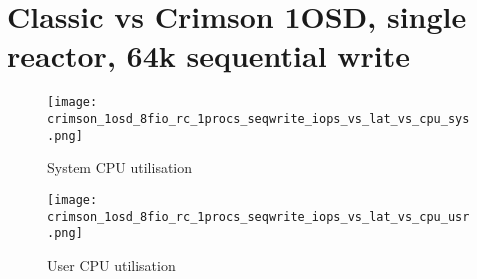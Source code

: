 \documentclass[]{report}
\begin{document}
\chapter{Classic vs Crimson 1OSD, single reactor, 64k sequential write}
\begin{figure}[ht]
  \centering
  \texttt{[image: crimson\_1osd\_8fio\_rc\_1procs\_seqwrite\_iops\_vs\_lat\_vs\_cpu\_sys.png]}
\caption{System CPU utilisation}
\end{figure}

\begin{figure}[h]
  \centering
  \texttt{[image: crimson\_1osd\_8fio\_rc\_1procs\_seqwrite\_iops\_vs\_lat\_vs\_cpu\_usr.png]}
\caption{User CPU utilisation}
\end{figure}
\end{document}
